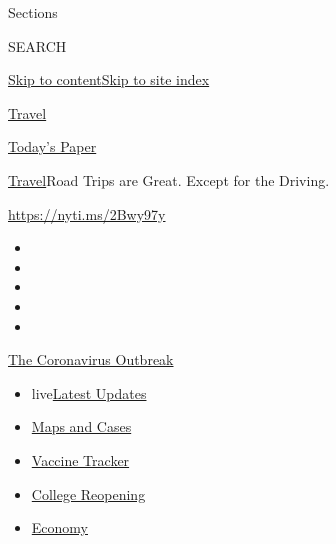 Sections

SEARCH

\protect\hyperlink{site-content}{Skip to
content}\protect\hyperlink{site-index}{Skip to site index}

\href{https://www.nytimes.com/section/travel}{Travel}

\href{https://myaccount.nytimes.com/auth/login?response_type=cookie\&client_id=vi}{}

\href{https://www.nytimes.com/section/todayspaper}{Today's Paper}

\href{/section/travel}{Travel}\textbar{}Road Trips are Great. Except for
the Driving.

\url{https://nyti.ms/2Bwy97y}

\begin{itemize}
\item
\item
\item
\item
\item
\end{itemize}

\href{https://www.nytimes.com/news-event/coronavirus?action=click\&pgtype=Article\&state=default\&region=TOP_BANNER\&context=storylines_menu}{The
Coronavirus Outbreak}

\begin{itemize}
\tightlist
\item
  live\href{https://www.nytimes.com/2020/08/04/world/coronavirus-cases.html?action=click\&pgtype=Article\&state=default\&region=TOP_BANNER\&context=storylines_menu}{Latest
  Updates}
\item
  \href{https://www.nytimes.com/interactive/2020/us/coronavirus-us-cases.html?action=click\&pgtype=Article\&state=default\&region=TOP_BANNER\&context=storylines_menu}{Maps
  and Cases}
\item
  \href{https://www.nytimes.com/interactive/2020/science/coronavirus-vaccine-tracker.html?action=click\&pgtype=Article\&state=default\&region=TOP_BANNER\&context=storylines_menu}{Vaccine
  Tracker}
\item
  \href{https://www.nytimes.com/2020/08/02/us/covid-college-reopening.html?action=click\&pgtype=Article\&state=default\&region=TOP_BANNER\&context=storylines_menu}{College
  Reopening}
\item
  \href{https://www.nytimes.com/live/2020/08/04/business/stock-market-today-coronavirus?action=click\&pgtype=Article\&state=default\&region=TOP_BANNER\&context=storylines_menu}{Economy}
\end{itemize}

